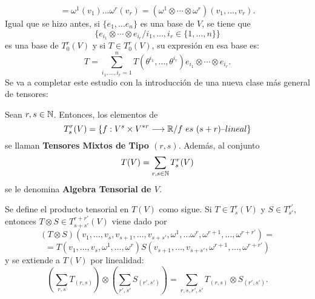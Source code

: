 \documentclass[cursovd_portada.tex]{subfiles}
\begin{document}
$$=\omega^1(v_1)\dots\omega^r(v_r)=(\omega^1\otimes\cdots\otimes\omega^r)(v_1,
\dots ,v_r).$$ \hs Igual que se hizo antes, si $\{e_1, \dots e_n\}$ es una base de $V$, se tiene que
$$\{e_{i_1}\otimes\cdots\otimes e_{i_r}/i_1,\dots ,i_r\in\{1,\dots ,n\}\}$$
es una base de $T^r_0(V)$ y si $T\in T^r_0(V)$, su expresión en esa base es:
$$T=\sum_{i_1,\dots,i_r=1}^{n}T(\theta^{i_1},\dots ,\theta^{i_r})e_{i_1}
\otimes\cdots\otimes e_{i_r}.$$ \hs Se va a completar este estudio con la introducción de una nueva clase más
general de tensores:
\begin{defiap}
Sean $r,s\in\mathbb{N}$. Entonces, los elementos de
$$T^r_s(V)=\{f:V^s\times V^{*r}\longrightarrow\mathbb{R} /f\mbox{ }es\mbox{ }(s+r)\mbox{--}lineal
\}$$ se llaman {\bf Tensores Mixtos de Tipo $(r,s)$}. Además, al conjunto
$$T(V)=\sum_{r,s\in\mathbb{N}}T^r_s(V)$$
se le denomina {\bf Algebra Tensorial de $V$}.
\end{defiap}
\par\bigskip
Se define el producto tensorial en $T(V)$ como sigue. Si $T\in T^r_s(V)$ y $S \in T^{r'}_{s'}$, entonces $T\otimes
S\in T^{r+r'}_{s+s'}(V)$ viene dado por
$$(T\otimes S)(v_1,\dots, v_s,v_{s+1},\dots ,v_{s+s'},\omega^1,\dots\omega^r,
\omega^{r+1},\dots ,\omega^{r+r'})=$$
$$=T(v_1,\dots ,v_s,\omega^1,\dots ,\omega^r)S(v_{s+1},\dots, v_{s+s'},\omega^
{r+1},\dots ,\omega^{r+r'})$$ y se extiende a $T(V)$ por linealidad:
$$(\sum_{r,s}T_{(r,s)})\otimes(\sum_{r',s'}S_{(r',s')})=\sum_{r,s,r',s'}T_{(
r,s)}\otimes S_{(r',s')}.$$

\newpage
\end{document}

